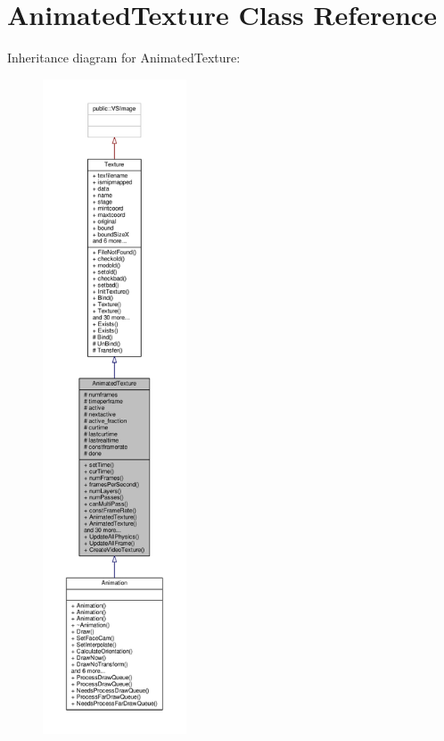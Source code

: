 \hypertarget{classAnimatedTexture}{}\section{Animated\+Texture Class Reference}
\label{classAnimatedTexture}


Inheritance diagram for Animated\+Texture\+:
\nopagebreak
\begin{figure}[H]
\begin{center}
\leavevmode
\includegraphics[height=550pt]{da/de7/classAnimatedTexture__inherit__graph}
\end{center}
\end{figure}


